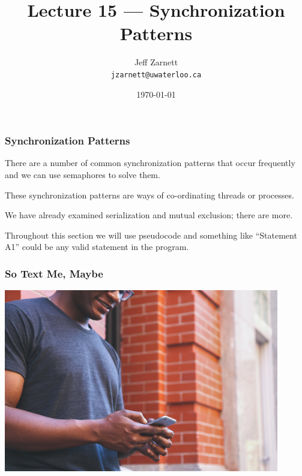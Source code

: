 

\title{Lecture 15 --- Synchronization Patterns }

\author{Jeff Zarnett \\ \small \texttt{jzarnett@uwaterloo.ca}}
\date{\today}




\begin{frame}
	\titlepage

\end{frame}

\begin{frame}
	\frametitle{Synchronization Patterns}


	There are a number of common synchronization patterns that occur frequently and we can use semaphores to solve them.

	These synchronization patterns are ways of co-ordinating threads or processes.

	We have already examined serialization and mutual exclusion; there are more.

	Throughout this section we will use pseudocode and something like ``Statement A1'' could be any valid statement in the program.

\end{frame}


\begin{frame}
	\frametitle{So Text Me, Maybe}

	\begin{center}
		\includegraphics[width=0.9\textwidth]{images/texting.jpeg}
	\end{center}


\end{frame}


